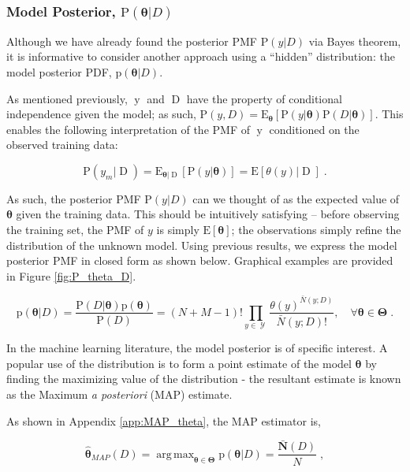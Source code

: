 \documentclass[12pt]{report}
\DeclareMathOperator*{\argmax}{arg\,max}
\DeclareMathOperator{\yrm}{\mathrm{y}}
\DeclareMathOperator{\Drm}{\mathrm{D}}
\DeclareMathOperator{\Ycal}{\mathcal{Y}}
\begin{document}
\subsubsection{Model Posterior, $\text{P}(\bm{\theta} | D)$}

Although we have already found the posterior PMF $\text{P}(y | D)$ via Bayes theorem, it is informative to consider another approach using a ``hidden'' distribution: the model posterior PDF, $\text{p}(\bm{\theta} | D)$. 

As mentioned previously, $\yrm$ and $\Drm$ have the property of conditional independence given the model; as such, $\text{P}(y,D) = \text{E}_{\bm{\theta}} \left[ \text{P}(y | \bm{\theta}) \text{P}(D | \bm{\theta}) \right]$. This enables the following interpretation of the PMF of $\yrm$ conditioned on the observed training data:

\begin{equation}
\text{P}(y_m | \Drm) = \text{E}_{\bm{\theta} | \Drm} \left[ \text{P}(y|\bm{\theta}) \right] = \text{E}\left[ \theta(y) | \Drm \right] \;.
\end{equation}

As such, the posterior PMF $\text{P}(y | D)$ can we thought of as the expected value of $\bm{\theta}$ given the training data. This should be intuitively satisfying -- before observing the training set, the PMF of $y$ is simply $\text{E}[\bm{\theta}]$; the observations simply refine the distribution of the unknown model. Using previous results, we express the model posterior PMF in closed form as shown below. Graphical examples are provided in Figure \ref{fig:P_theta_D}.

\begin{equation} \label{P_t_D}
\text{p}(\bm{\theta} | D) = \frac{\text{P}(D | \bm{\theta}) \text{p}(\bm{\theta})}{\text{P}(D)}
= (N+M-1)! \prod_{y \in \Ycal} \frac{\theta(y)^{\bar{N}(y;D)}}{\bar{N}(y;D)!} ,  \quad  \forall \bm{\theta} \in \bm{\Theta} \;.
\end{equation}


In the machine learning literature, the model posterior is of specific interest. A popular use of the distribution is to form a point estimate of the model $\bm{\theta}$ by finding the maximizing value of the distribution - the resultant estimate is known as the Maximum \emph{a posteriori} (MAP) estimate. 

As shown in Appendix \ref{app:MAP_theta}, the MAP estimator is,

\begin{equation}
\hat{\bm{\theta}}_{MAP}(D) = \argmax_{\bm{\theta} \in \bm{\Theta}} \text{p}(\bm{\theta} | D) = \frac{\bar{\bm{N}}(D)}{N} \;,
\end{equation}
\end{document}
